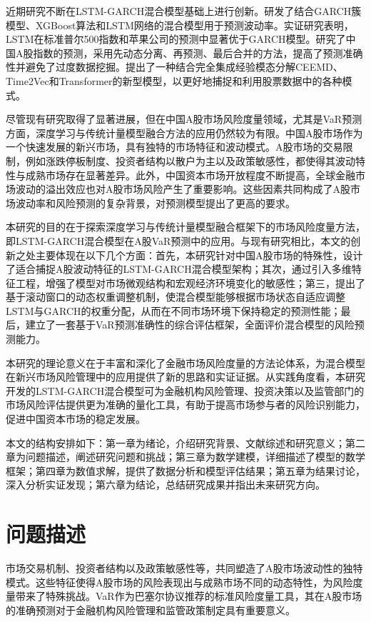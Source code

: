 \documentclass[12pt, a4paper]{article}
\begin{document}
近期研究不断在LSTM-GARCH混合模型基础上进行创新。\citet{araya2024hybrid}研发了结合GARCH簇模型、XGBoost算法和LSTM网络的混合模型用于预测波动率。实证研究表明，LSTM在标准普尔500指数和苹果公司的预测中显著优于GARCH模型。\citet{yao2024time}研究了中国A股指数的预测，采用先动态分离、再预测、最后合并的方法，提高了预测准确性并避免了过度数据挖掘。\citet{chen2024hybrid}提出了一种结合完全集成经验模态分解CEEMD、Time2Vec和Transformer的新型模型，以更好地捕捉和利用股票数据中的各种模式。

尽管现有研究取得了显著进展，但在中国A股市场风险度量领域，尤其是VaR预测方面，深度学习与传统计量模型融合方法的应用仍然较为有限。中国A股市场作为一个快速发展的新兴市场，具有独特的市场特征和波动模式。A股市场的交易限制，例如涨跌停板制度、投资者结构以散户为主以及政策敏感性，都使得其波动特性与成熟市场存在显著差异。此外，中国资本市场开放程度不断提高，全球金融市场波动的溢出效应也对A股市场风险产生了重要影响。这些因素共同构成了A股市场波动率和风险预测的复杂背景，对预测模型提出了更高的要求。

本研究的目的在于探索深度学习与传统计量模型融合框架下的市场风险度量方法，即LSTM-GARCH混合模型在A股VaR预测中的应用。与现有研究相比，本文的创新之处主要体现在以下几个方面：首先，本研究针对中国A股市场的特殊性，设计了适合捕捉A股波动特征的LSTM-GARCH混合模型架构；其次，通过引入多维特征工程，增强了模型对市场微观结构和宏观经济环境变化的敏感性；第三，提出了基于滚动窗口的动态权重调整机制，使混合模型能够根据市场状态自适应调整LSTM与GARCH的权重分配，从而在不同市场环境下保持稳定的预测性能；最后，建立了一套基于VaR预测准确性的综合评估框架，全面评价混合模型的风险预测能力。

本研究的理论意义在于丰富和深化了金融市场风险度量的方法论体系，为混合模型在新兴市场风险管理中的应用提供了新的思路和实证证据。从实践角度看，本研究开发的LSTM-GARCH混合模型可为金融机构风险管理、投资决策以及监管部门的市场风险评估提供更为准确的量化工具，有助于提高市场参与者的风险识别能力，促进中国资本市场的稳定发展。

本文的结构安排如下：第一章为绪论，介绍研究背景、文献综述和研究意义；第二章为问题描述，阐述研究问题和挑战；第三章为数学建模，详细描述了模型的数学框架；第四章为数值求解，提供了数据分析和模型评估结果；第五章为结果讨论，深入分析实证发现；第六章为结论，总结研究成果并指出未来研究方向。

\section{问题描述}

市场交易机制、投资者结构以及政策敏感性等，共同塑造了A股市场波动性的独特模式。这些特征使得A股市场的风险表现出与成熟市场不同的动态特性，为风险度量带来了特殊挑战。VaR作为巴塞尔协议推荐的标准风险度量工具，其在A股市场的准确预测对于金融机构风险管理和监管政策制定具有重要意义。
\end{document}
